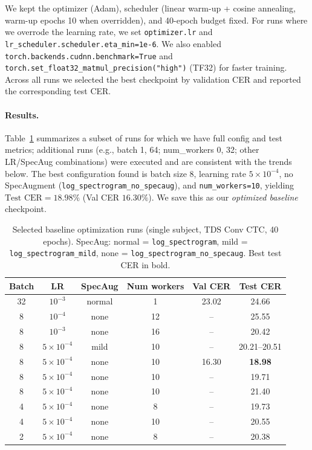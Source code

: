 We kept the optimizer (Adam), scheduler (linear warm-up + cosine annealing, warm-up epochs 10 when overridden), and 40-epoch budget fixed. For runs where we overrode the learning rate, we set \texttt{optimizer.lr} and \texttt{lr\_scheduler.scheduler.eta\_min=1e-6}. We also enabled \texttt{torch.backends.cudnn.benchmark=True} and \texttt{torch.set\_float32\_matmul\_precision("high")} (TF32) for faster training. Across all runs we selected the best checkpoint by validation CER and reported the corresponding test CER.

\paragraph{Results.}
Table~\ref{tab:baseline_ablation} summarizes a subset of runs for which we have full config and test metrics; additional runs (e.g., batch 1, 64; num\_workers 0, 32; other LR/SpecAug combinations) were executed and are consistent with the trends below. The best configuration found is batch size 8, learning rate $5\times10^{-4}$, no SpecAugment (\texttt{log\_spectrogram\_no\_specaug}), and \texttt{num\_workers=10}, yielding $\text{Test CER} = 18.98\%$ (Val CER $16.30\%$). We save this as our \emph{optimized baseline} checkpoint.

\begin{table}[t]
    \centering
    \caption{Selected baseline optimization runs (single subject, TDS Conv CTC, 40 epochs). SpecAug: normal = \texttt{log\_spectrogram}, mild = \texttt{log\_spectrogram\_mild}, none = \texttt{log\_spectrogram\_no\_specaug}. Best test CER in bold.}
    \label{tab:baseline_ablation}
    \begin{tabular}{cccccc}
        \toprule
        Batch & LR & SpecAug & Num workers & Val CER & Test CER \\
        \midrule
        32 & $10^{-3}$ & normal & 1 & 23.02 & 24.66 \\
        \midrule
        8 & $10^{-4}$ & none & 12 & -- & 25.55 \\
        8 & $10^{-3}$ & none & 16 & -- & 20.42 \\
        8 & $5{\times}10^{-4}$ & mild & 10 & -- & 20.21--20.51 \\
        8 & $5{\times}10^{-4}$ & none & 10 & 16.30 & \textbf{18.98} \\
        8 & $5{\times}10^{-4}$ & none & 10 & -- & 19.71 \\
        8 & $5{\times}10^{-4}$ & none & 10 & -- & 21.40 \\
        4 & $5{\times}10^{-4}$ & none & 8 & -- & 19.73 \\
        4 & $5{\times}10^{-4}$ & none & 10 & -- & 20.55 \\
        2 & $5{\times}10^{-4}$ & none & 8 & -- & 20.38 \\
        \bottomrule
    \end{tabular}
\end{table}

